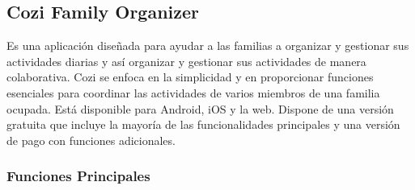\subsection{Cozi Family Organizer}
\label{sec:cozi}
Es una aplicación diseñada para ayudar a las familias a organizar y gestionar sus actividades diarias y así organizar y 
gestionar sus actividades de manera colaborativa. Cozi se enfoca en la simplicidad y en proporcionar funciones esenciales para coordinar 
las actividades de varios miembros de una familia ocupada. Está disponible para Android, iOS y la web. Dispone de una versión 
gratuita que incluye la mayoría de las funcionalidades principales y una versión de pago con funciones adicionales. \cite{cozi2025}

\subsubsection{Funciones Principales}
\label{subsec:funciones_cozi}

